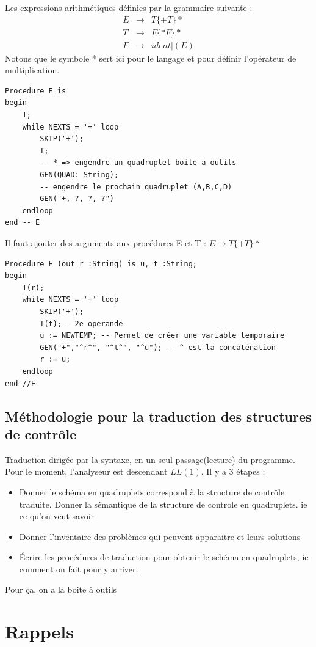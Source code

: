 \documentclass[12pt,a4paper,openany]{book}
\begin{document}
	\begin{exemple}
		Les expressions arithmétiques définies par la grammaire suivante :
		\begin{eqnarray*}
			E &\rightarrow& T\{+T\}*\\
			T &\rightarrow& F\{*F\}*\\
			F &\rightarrow& ident|(E)
		\end{eqnarray*}
		Notons que le symbole * sert ici pour le langage et pour définir l'opérateur de multiplication.
\begin{lstlisting}[language=Algo, framerule=0pt,  numbers=none]
Procedure E is
begin
	T;
	while NEXTS = '+' loop
		SKIP('+');
		T;
		-- * => engendre un quadruplet boite a outils
		GEN(QUAD: String);
		-- engendre le prochain quadruplet (A,B,C,D)
		GEN("+, ?, ?, ?")
	endloop 
end -- E
\end{lstlisting}
Il faut ajouter des arguments aux procédures E et T : $E \rightarrow T\{+T\}*$
\begin{lstlisting}[language=Algo, framerule=0pt,  numbers=none]
Procedure E (out r :String) is u, t :String;
begin
	T(r);
	while NEXTS = '+' loop
		SKIP('+');
		T(t); --2e operande
		u := NEWTEMP; -- Permet de créer une variable temporaire
		GEN("+","^r^", "^t^", "^u"); -- ^ est la concaténation 
		r := u;
	endloop
end //E
\end{lstlisting}
	\end{exemple}
	\section{Méthodologie pour la traduction des structures de contrôle}
	Traduction dirigée par la syntaxe, en un seul passage(lecture) du programme. Pour le moment, l'analyseur est descendant $LL(1)$. Il y a 3 étapes
	: 
	\begin{itemize}
		\item Donner le schéma en quadruplets correspond à la structure de contrôle traduite. Donner la sémantique de la structure de controle en quadruplets. ie ce qu'on veut savoir
		\item Donner l'inventaire des problèmes qui peuvent apparaitre et leurs solutions
		\item Écrire les procédures de traduction pour obtenir le schéma en quadruplets, ie comment on fait pour y arriver.
	\end{itemize}
	Pour ça, on a la boite à outils

	\appendix
	\chapter{Rappels}
\end{document}
